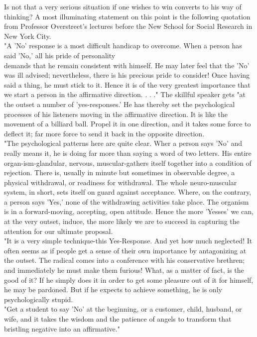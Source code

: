\documentclass[10pt]{article}
\begin{document}
Is not that a very serious situation if one wishes to win converts to his way of thinking? A most illuminating statement on this point is the following quotation from Professor Overstreet's lectures before the New School for Social Research in New York City.\\
"A 'No' response is a most difficult handicap to overcome. When a person has said 'No,' all his pride of personality\\
demands that he remain consistent with himself. He may later feel that the 'No' was ill advised; nevertheless, there is his precious pride to consider! Once having said a thing, he must stick to it. Hence it is of the very greatest importance that we start a person in the affirmative direction. . . ." The skillful speaker gets "at the outset a number of 'yes-responses.' He has thereby set the psychological processes of his listeners moving in the affirmative direction. It is like the movement of a billiard ball. Propel it in one direction, and it takes some force to deflect it; far more force to send it back in the opposite direction.\\
"The psychological patterns here are quite clear. Wher a person says 'No' and really means it, he is doing far more than saying a word of two letters. His entire organ-ism-glandular, nervous, muscular-gathers itself together into a condition of rejection. There is, usually in minute but sometimes in observable degree, a physical withdrawal, or readiness for withdrawal. The whole neuro-muscular system, in short, sets itself on guard against acceptance. Where, on the contrary, a person says 'Yes,' none of the withdrawing activities take place. The organism is in a forward-moving, accepting, open attitude. Hence the more 'Yesses' we can, at the very outset, induce, the more likely we are to succeed in capturing the attention for our ultimate proposal.\\
"It is a very simple technique-this Yes-Response. And yet how much neglected! It often seems as if people get a sense of their own importance by antagonizing at the outset. The radical comes into a conference with his conservative brethren; and immediately he must make them furious! What, as a matter of fact, is the good of it? If he simply does it in order to get some pleasure out of it for himself, he may be pardoned. But if he expects to achieve something, he is only psychologically stupid.\\
"Get a student to say 'No' at the beginning, or a customer, child, husband, or wife, and it takes the wisdom and the patience of angels to transform that bristling negative into an affirmative."
\end{document}
